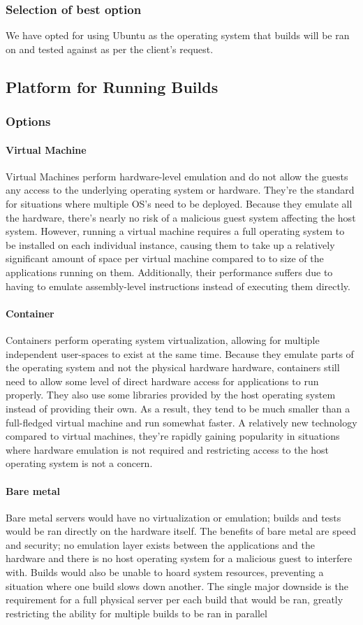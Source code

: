 \documentclass[10pt,letterpaper,onecolumn,draftclsnofoot]{IEEEtran}
\begin{document}
\subsubsection{Selection of best option}
We have opted for using Ubuntu as the operating system that builds will be ran on and tested against as per the client's request.
\subsection{Platform for Running Builds}
\subsubsection{Options}
\paragraph{Virtual Machine}
Virtual Machines perform hardware-level emulation and do not allow the guests any access to the underlying operating system or hardware. They're the standard for situations where multiple OS's need to be deployed. Because they emulate all the hardware, there's nearly no risk of a malicious guest system affecting the host system. However, running a virtual machine requires a full operating system to be installed on each individual instance, causing them to take up a relatively significant amount of space per virtual machine compared to to size of the applications running on them. Additionally, their performance suffers due to having to emulate assembly-level instructions instead of executing them directly.
\paragraph{Container}
Containers perform operating system virtualization, allowing for multiple independent user-spaces to exist at the same time. Because they emulate parts of the operating system and not the physical hardware hardware, containers still need to allow some level of direct hardware access for applications to run properly. They also use some libraries provided by the host operating system instead of providing their own. As a result, they tend to be much smaller than a full-fledged virtual machine and run somewhat faster. A relatively new technology compared to virtual machines, they're rapidly gaining popularity in situations where hardware emulation is not required and restricting access to the host operating system is not a concern.
\paragraph{Bare metal}
Bare metal servers would have no virtualization or emulation; builds and tests would be ran directly on the hardware itself. The benefits of bare metal are speed and security; no emulation layer exists between the applications and the hardware and there is no host operating system for a malicious guest to interfere with. Builds would also be unable to hoard system resources, preventing a situation where one build slows down another. The single major downside is the requirement for a full physical server per each build that would be ran, greatly restricting the ability for multiple builds to be ran in parallel
\end{document}
